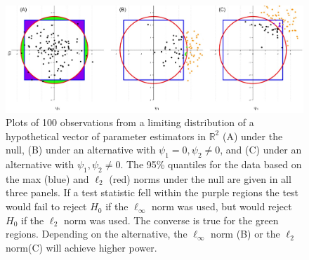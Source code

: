 \documentclass{article}
\begin{document}
\begin{figure}
	\centering
	\includegraphics[width = \linewidth]{figure_code/pwr_cmp.jpeg}
	\caption{Plots of 100 observations from a limiting distribution of a hypothetical vector of parameter estimators in $\mathbb{R}^2$ (A) under the null, (B) under an alternative with $\psi_1 = 0, \psi_2 \neq 0$, and (C) under an alternative with $\psi_1, \psi_2 \neq 0$. The 95\% quantiles for the data based on the max (blue) and $\ell_2$ (red) norms under the null are given in all three panels. If a test statistic fell within the purple regions the test would fail to reject $H_0$ if the $\ell_\infty$ norm was used, but would reject $H_0$ if the $\ell_2$ norm was used.  The converse is true for the green regions.  Depending on the alternative, the $\ell_\infty$ norm (B) or the $\ell_2$ norm(C) will achieve higher power.}
	\label{fig:figure1}
\end{figure}

\end{document}
